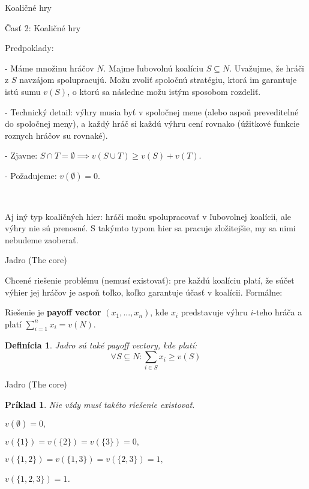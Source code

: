 \documentclass{beamer}
\newtheorem*{mydef}{Defin\'icia}
\newtheorem*{exampl}{Pr\'iklad}
\begin{document}
\begin{frame}{Koali\v{c}n\'e hry}

\v{C}as\v{t} 2: Koali\v{c}n\'e hry

Predpoklady:

- M\'ame mno\v{z}inu hr\'a\v{c}ov $N$. Majme \v{l}ubovoln\'u koal\'iciu $S \subseteq N$. Uva\v{z}ujme, \v{z}e hr\'a\v{c}i z $S$ navz\'ajom spolupracuj\'u. Mo\v{z}u zvoli\v{t} spolo\v{c}n\'u strat\'egiu, ktor\'a im garantuje ist\'u sumu $v(S)$, o ktor\'u sa n\'asledne mo\v{z}u ist\'ym sposobom rozdeli\v{t}. 

- Technick\'y detail: v\'yhry musia by\v{t} v spolo\v{c}nej mene (alebo aspo\v{n} prevediteln\'e do spolo\v{c}nej meny), a ka\v{z}d\'y hr\'a\v{c} si ka\v{z}d\'u v\'yhru cen\'i rovnako (\'u\v{z}itkov\'e funkcie roznych hr\'a\v{c}ov su rovnak\'e).

- Zjavne: $S \cap T = \emptyset \implies v(S \cup T) \geq v(S) + v(T)$.

- Po\v{z}adujeme: $v(\emptyset)=0$.

\

Aj in\'y typ koali\v{c}n\'ych hier: hr\'a\v{c}i mo\v{z}u spolupracova\v{t} v \v{l}ubovolnej koal\'icii, ale v\'yhry nie s\'u prenosn\'e. S tak\'ymto typom hier sa pracuje zlo\v{z}itej\v{s}ie, my sa nimi nebudeme zaobera\v{t}.

\end{frame}




\begin{frame}{Jadro (The core)}

Chcen\'e rie\v{s}enie probl\'emu (nemus\'i existova\v{t}): pre ka\v{z}d\'u koal\'iciu plat\'i, \v{z}e s\'u\v{c}et v\'yhier jej hr\'a\v{c}ov je aspo\v{n} to\v{l}ko, ko\v{l}ko garantuje \'u\v{c}as\v{t} v koal\'icii. Form\'alne:

Rie\v{s}enie je {\bf payoff vector} $(x_{1}, ..., x_{n})$, kde $x_{i}$ predstavuje v\'yhru $i$-teho hr\'a\v{c}a a plat\'i $\sum_{i=1}^{n} x_{i} = v(N)$.

\begin{mydef}
Jadro s\'u tak\'e payoff vectory, kde plat\'i:
\[\forall S \subseteq N: \sum_{i \in S}x_{i} \geq v(S)\]
\end{mydef}


\end{frame}


\begin{frame}{Jadro (The core)}

\begin{exampl} Nie v\v{z}dy mus\'i tak\'eto rie\v{s}enie existova\v{t}. 

$v(\emptyset)=0,$

$ v(\{1\})=v(\{2\})=v(\{3\})=0,$

$v(\{1,2\})=v(\{1,3\})=v(\{2,3\})=1, $

$v(\{1,2,3\})=1$.

\end{exampl}


\end{frame}
\end{document}
